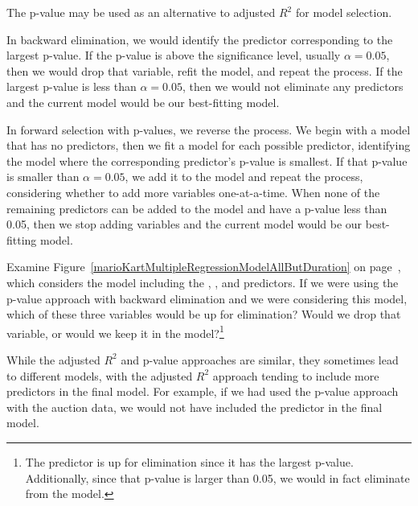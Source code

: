 The p-value may be used as an alternative to adjusted $R^2$ for model selection.

In backward elimination, we would identify the predictor corresponding to the largest p-value. If the p-value is above the significance level, usually $\alpha = 0.05$, then we would drop that variable, refit the model, and repeat the process. If the largest p-value is less than $\alpha = 0.05$, then we would not eliminate any predictors and the current model would be our best-fitting model.

In forward selection with p-values, we reverse the process. We begin with a model that has no predictors, then we fit a model for each possible predictor, identifying the model where the corresponding predictor's p-value is smallest. If that p-value is smaller than $\alpha = 0.05$, we add it to the model and repeat the process, considering whether to add more variables one-at-a-time. When none of the remaining predictors can be added to the model and have a p-value less than 0.05, then we stop adding variables and the current model would be our best-fitting model.

\begin{exercise}
Examine Figure~\ref{marioKartMultipleRegressionModelAllButDuration} on page~\pageref{marioKartMultipleRegressionModelAllButDuration}, which considers the model including the , , and  predictors. If we were using the p-value approach with backward elimination and we were considering this model, which of these three variables would be up for elimination? Would we drop that variable, or would we keep it in the model?\footnote{The  predictor is up for elimination since it has the largest p-value. Additionally, since that p-value is larger than 0.05, we would in fact eliminate  from the model.}
\end{exercise}

While the adjusted $R^2$ and p-value approaches are similar, they sometimes lead to different models, with the adjusted $R^2$ approach tending to include more predictors in the final model. For example, if we had used the p-value approach with the auction data, we would not have included the  predictor in the final model.

